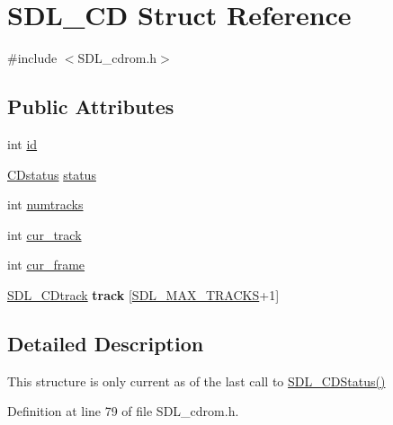 \hypertarget{structSDL__CD}{\section{S\+D\+L\+\_\+\+C\+D Struct Reference}
\label{structSDL__CD}
}


{\ttfamily \#include $<$S\+D\+L\+\_\+cdrom.\+h$>$}

\subsection*{Public Attributes}
\begin{DoxyCompactItemize}
\item 
int \hyperlink{structSDL__CD_ab48f9cbecf78bc689649d877eceba103}{id}
\item 
\hyperlink{SDL__cdrom_8h_ae689551deb9bd434bce7e4c39e45e15d}{C\+Dstatus} \hyperlink{structSDL__CD_afaab8559e9b75bbf501b31b5f5f01a9b}{status}
\end{DoxyCompactItemize}
{\bf }\par
\begin{DoxyCompactItemize}
\item 
int \hyperlink{structSDL__CD_ade87d0c7e217291fb1f1a53d03e1bfdf}{numtracks}
\item 
int \hyperlink{structSDL__CD_afe5a3ca65be47b34c72ac21ce28de31e}{cur\+\_\+track}
\item 
int \hyperlink{structSDL__CD_a42123aeca413aa581c1403843d1a5809}{cur\+\_\+frame}
\item 
\hypertarget{structSDL__CD_ad9dd6d42b8c1677e83926aa9e9031ecc}{\hyperlink{structSDL__CDtrack}{S\+D\+L\+\_\+\+C\+Dtrack} {\bfseries track} \mbox{[}\hyperlink{SDL__cdrom_8h_a39eb10e45614b6b607fe7649c9dd75da}{S\+D\+L\+\_\+\+M\+A\+X\+\_\+\+T\+R\+A\+C\+K\+S}+1\mbox{]}}\label{structSDL__CD_ad9dd6d42b8c1677e83926aa9e9031ecc}

\end{DoxyCompactItemize}



\subsection{Detailed Description}
This structure is only current as of the last call to \hyperlink{SDL__cdrom_8h_a696066cb9444206195dfad7f77f2b38c}{S\+D\+L\+\_\+\+C\+D\+Status()} 

Definition at line 79 of file S\+D\+L\+\_\+cdrom.\+h.



